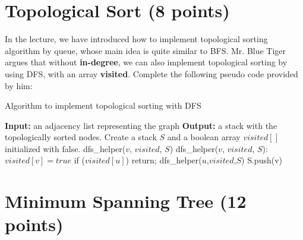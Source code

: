 \documentclass[11pt]{exam}
\begin{document}
\section{Topological Sort (8 points)}
In the lecture, we have introduced how to implement topological sorting algorithm by queue, whose main idea is quite similar to BFS. Mr. Blue Tiger argues that without \textbf{in-degree}, we can also implement topological sorting by using DFS, with an array \textbf{visited}. Complete the following pseudo code provided by him:
\newline
\newline
\begin{algorithm}[htbp]
    \caption{Algorithm to implement topological sorting with DFS}
    \begin{algorithmic}[1]
        \STATE \textbf{Input:} an adjacency list representing the graph
        \STATE \textbf{Output:} a stack with the topologically sorted nodes.
        \STATE Create a stack $S$ and a boolean array $visited[]$ initialized with false.
        \STATE dfs\_helper($v$, $visited$, $S$)
        \ENDFOR
        \newline
        \STATE dfs\_helper($v$, $visited$, $S$):
        \STATE $visited[v] = true$
        \newline
        \STATE if ($visited[u]$) return;
        \STATE dfs\_helper($u$,$visited$,$S$)
        \newline
        \ENDFOR
        \STATE S.push(v)
    \end{algorithmic}
\end{algorithm}
\section{Minimum Spanning Tree (12 points)}
\end{document}
